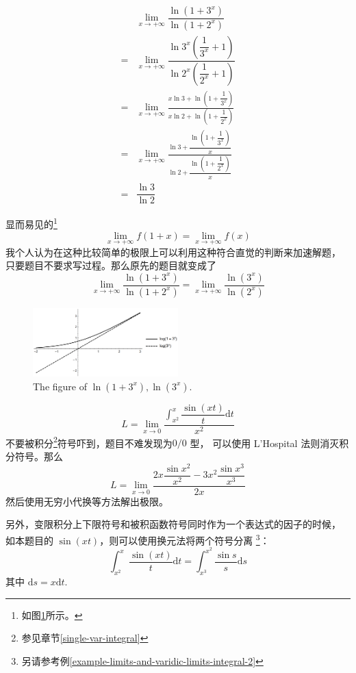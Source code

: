 \begin{example}
    \begin{align*}
         &\lim_{x \to + \infty} \dfrac{\ln (1+3^x)}{\ln (1+2^x)}\\
        =&\lim_{x \to + \infty} \dfrac{\ln 3^x \left(\dfrac{1}{3^x} + 1\right)}{\ln 2^x \left(\dfrac{1}{2^x} + 1\right)}\\
        =&\lim_{x \to + \infty} 
        \frac{
            x\ln 3 + \ln \left(1+\dfrac{1}{3^x}\right)
        }{
            x\ln 2 + \ln \left(1+\dfrac{1}{2^x}\right)
        }\\
        =&\lim_{x \to + \infty} 
        \frac{
            \ln 3 + \dfrac{\ln \left(1+\dfrac{1}{3^x}\right)}{x}
        }{
            \ln 2 + \dfrac{\ln \left(1+\dfrac{1}{2^x}\right)}{x}
        }\\
        =&\dfrac{\ln 3}{\ln 2}
    \end{align*}

    显而易见的\footnote{如图\ref{fig:ln-1-plus-3-to-x-and-its-sibling}所示。}
    \[
        \lim_{x \to +\infty} f(1 + x) = \lim_{x \to +\infty} f(x)
    \]
    我个人认为在这种比较简单的极限上可以利用这种符合直觉的判断来加速解题，
    只要题目不要求写过程。那么原先的题目就变成了
    \[
         \lim_{x \to + \infty} \dfrac{\ln (1+3^x)}{\ln (1+2^x)} = 
         \lim_{x \to + \infty} \dfrac{\ln (3^x)}{\ln (2^x)}
    \]
\end{example}

\begin{figure}
  \centering
  \includegraphics[width=0.5\textwidth]{figure/ln(1plus3tox)-ln(3tox).png}
  \caption{The figure of $\ln(1+3^x), \ln(3^x)$.}
  \label{fig:ln-1-plus-3-to-x-and-its-sibling}
\end{figure}

\begin{example}
    \label{example-limits-and-varidic-limits-integral-1}
    \[
        L = \lim_{x \to 0} 
        \dfrac{\int_{x^2}^{x} \dfrac{\sin (xt)}{t} \mathrm dt }{x^2}
    \]
    不要被积分\footnote{参见章节\ref{single-var-integral}}符号吓到，题目不难发现为$0/0$ 型，
    可以使用 L'Hospital 法则消灭积分符号。那么
    \[
        L = \lim_{x \to 0} \dfrac{2x \dfrac{\sin x^2}{x^2} - 3x^2 \dfrac{\sin x^3}{x^3}}{2x}
    \]
    然后使用无穷小代换等方法解出极限。

    另外，变限积分上下限符号和被积函数符号同时作为一个表达式的因子的时候，
    如本题目的 $\sin (xt)$，则可以使用换元法将两个符号分离
    \footnote{另请参考例\ref{example-limits-and-varidic-limits-integral-2}}：
    \[
        \int_{x^2}^{x}   \dfrac{\sin (xt)}{t}\mathrm dt  = 
        \int_{x^3}^{x^2} \dfrac{\sin s}{s}   \mathrm ds
    \]
    其中 $\mathrm ds = x \mathrm dt$.
\end{example}

